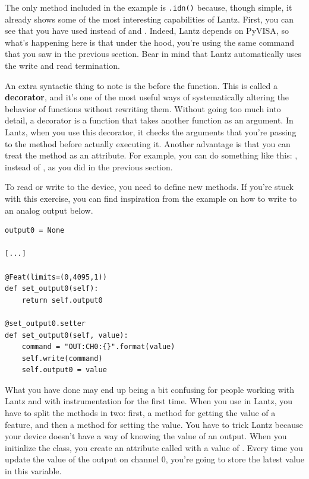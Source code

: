 The only method included in the example is \texttt{.idn()} because, though simple, it already shows some of the most interesting capabilities of Lantz. First, you can see that you have used  instead of  and . Indeed, Lantz depends on PyVISA, so what's happening here is that under the hood, you're using the same command that you saw in the previous section. Bear in mind that Lantz automatically uses the write and read termination.

An extra syntactic thing to note is the  before the function. This is called a \textbf{decorator}, and it's one of the most useful ways of systematically altering the behavior of functions without rewriting them. Without going too much into detail, a decorator is a function that takes another function as an argument. In Lantz, when you use this decorator, it checks the arguments that you're passing to the method before actually executing it. Another advantage is that you can treat the method as an attribute. For example, you can do something like this: , instead of , as you did in the previous section.


To read or write to the device, you need to define new methods. If you're stuck with this exercise, you can find inspiration from the example on how to write to an analog output below.

\begin{verbatim}
output0 = None

[...]

@Feat(limits=(0,4095,1))
def set_output0(self):
    return self.output0

@set_output0.setter
def set_output0(self, value):
    command = "OUT:CH0:{}".format(value)
    self.write(command)
    self.output0 = value
\end{verbatim}

What you have done may end up being a bit confusing for people working with Lantz and with instrumentation for the first time. When you use  in Lantz, you have to split the methods in two: first, a method for getting the value of a feature, and then a method for setting the value. You have to trick Lantz because your device doesn't have a way of knowing the value of an output. When you initialize the class, you create an attribute called  with a value of . Every time you update the value of the output on channel 0, you're going to store the latest value in this variable.

